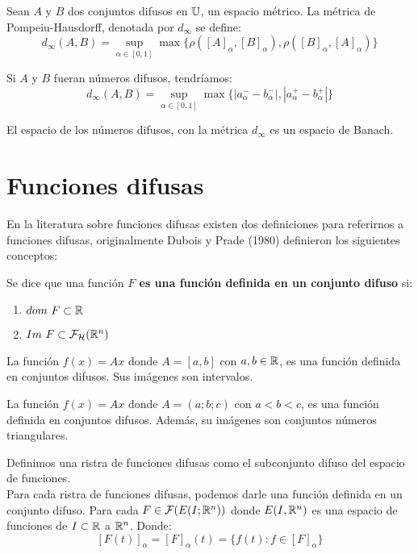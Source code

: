\begin{definicion}
	\label{def:metricadifusa}
	Sean $A$ y $B$ dos conjuntos difusos en $\mathbb U$, un espacio métrico. La métrica de Pompeiu-Hausdorff, denotada por $d_\infty$ se define:
	\[
		d_\infty(A, B) = \sup\limits_{\alpha \in [0, 1]} \max\{\rho([A]_\alpha, [B]_\alpha), \rho([B]_\alpha,  [A]_\alpha)\}
	\]
	
	Si $A$ y $B$ fueran números difusos, tendríamos:
	\[
		d_\infty(A, B) = \sup\limits_{\alpha \in [0, 1]} \max\{|a_\alpha^- - b_\alpha^-|, |a_\alpha^+ - b_\alpha^+|\}
	\]
\end{definicion}

\begin{teorema}
	\label{teorema:banach}
	El espacio de los números difusos, con la métrica $d_\infty$ es un espacio de Banach.
\end{teorema}

\section{Funciones difusas}
En la literatura sobre funciones difusas existen dos definiciones para referirnos a funciones difusas, originalmente Dubois y Prade (1980) definieron los siguientes conceptos:

\begin{definicion}
	\label{def:fizzusetvaluedfunc} Se dice que una función \textbf{$F$ es una función definida en un conjunto difuso} si:
	\begin{enumerate}
		\item $dom ~ F \subset \mathbb R$
		\item $Im ~ F \subset \mathcal{F}_\mathcal{H}(\mathbb R^n)$
	\end{enumerate}
\end{definicion}

\begin{ejemplo}
	La función $f(x) = A x$ donde $A=[a, b]$ con $a, b \in \mathbb R$, es una función definida en conjuntos difusos. Sus imágenes son intervalos.
\end{ejemplo}

\begin{ejemplo}
	La función $f(x) = A x$ donde $A=(a;b;c)$ con $a<b<c$, es una función definida en conjuntos difusos. Además, su imágenes son conjuntos números triangulares.
\end{ejemplo}

\iffalse
\begin{definicion}
	Definimos una ristra de funciones difusas como el subconjunto difuso del espacio de funciones. \\
	Para cada ristra de funciones difusas, podemos darle una función definida en un conjunto difuso. Para cada $F \in \mathcal{F}(E(I; \mathbb R^n))$ donde $E(I, \mathbb R^n)$ es una espacio de funciones de $I \subset \mathbb R$ a $\mathbb R^n$. Donde:
	\[
		[F(t)]_\alpha = [F]_\alpha(t) = \{f(t) : f \in [F]_\alpha\}
	\]
\end{definicion}

